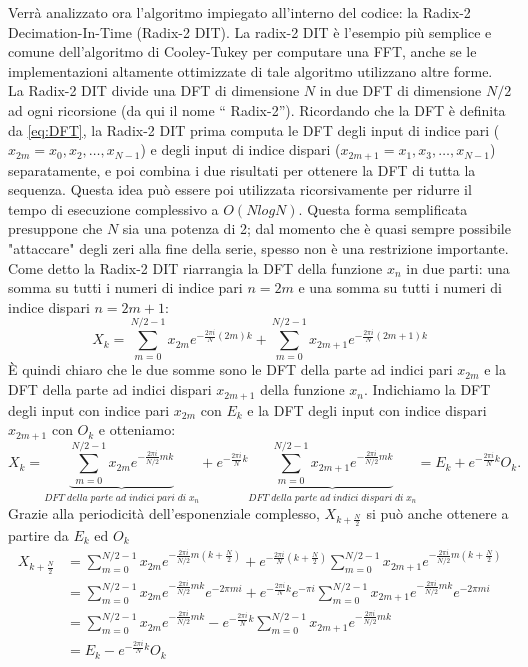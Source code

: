 \documentclass[a4paper, 12pt]{book}
\begin{document}
Verrà analizzato ora l'algoritmo impiegato all'interno del codice: la Radix-2 Decimation-In-Time (Radix-2 DIT).
La radix-2 DIT è l’esempio più semplice e comune dell'algoritmo di Cooley-Tukey per computare una FFT, anche se le implementazioni altamente ottimizzate di tale algoritmo utilizzano altre forme.
La Radix-2 DIT divide una DFT di dimensione $N$ in due DFT di dimensione $N/2$ ad ogni ricorsione (da qui il nome “ Radix-2”).
Ricordando che la DFT è definita da \ref{eq:DFT}, la Radix-2 DIT prima computa le DFT degli input di indice pari ($x_{2m}=x_0 , x_2 ,\ldots , x_{N-1}$) e degli input di indice dispari ($x_{2m+1}= x_1 , x_3 ,\ldots , x_{N-1}$) separatamente, e poi combina i due risultati per ottenere la DFT di tutta la sequenza.
Questa idea può essere poi utilizzata ricorsivamente per ridurre il tempo di esecuzione complessivo a $O(N log N)$.
Questa forma semplificata presuppone che $N$ sia una potenza di 2; dal momento che è quasi sempre possibile "attaccare" degli zeri alla fine della serie, spesso non è una restrizione importante.
Come detto la Radix-2 DIT riarrangia la DFT della funzione $x_n$ in due parti: una somma su tutti i numeri di indice pari $n=2m$ e una somma su tutti i numeri di indice dispari $n=2m+1$:
\begin{equation}
	X_k=\sum_{m=0}^{N/2-1} x_{2m} e^{-\frac{2\pi i}{N} (2m)k} + \sum_{m=0}^{N/2-1} 				x_{2m+1} e^{-\frac{2 \pi i}{N} (2m+1)k}
\end{equation}
È quindi chiaro che le due somme sono le DFT della parte ad indici pari $x_{2m}$ e la DFT della parte ad indici dispari $x_{2m+1}$ della funzione $x_n$.
Indichiamo la DFT degli input con indice pari $x_{2m}$ con $E_k$ e la DFT degli input con indice dispari $x_{2m+1}$ con $O_k$ e otteniamo:
\begin{equation}
	X_k=\underbrace{\sum_{m=0}^{N/2-1} x_{2m} e^{-\frac{2 \pi i}{N/2}mk}}_{DFT\; della			\; parte\; ad\; indici\; pari\; di\; x_n} + e^{-\frac{2 \pi i}{N}k} 						\underbrace{\sum_{m=0}^{N/2-1} x_{2m+1}e^{-\frac{2 \pi i}{N/2}mk}}_{DFT\; della\; 			parte\; ad\; indici\; dispari\; di\; x_n} = E_k + e^{-\frac{2 \pi i}{N}k} O_k .
\end{equation}
Grazie alla periodicità dell’esponenziale complesso, $X_{k+\frac{N}{2}}$ si può anche ottenere a partire da $E_k$ ed $O_k$
\begin{align}
	X_{k+\frac{N}{2}} &= \sum_{m=0}^{N/2-1} x_{2m} e^{-\frac{2 \pi i}{N/2}m(k+\frac{N}			{2})} + e^{-\frac{2 \pi i}{N}(k+\frac{N}{2})} \sum_{m=0}^{N/2-1}  x_{2m+1} e^{-				\frac{2 \pi i}{N/2}m(k+\frac{N}{2})} \\
	&=\sum_{m=0}^{N/2-1} x_{2m} e^{-\frac{2 \pi i}{N/2}mk} e^{-2 \pi mi} + e^{-\frac{2 			\pi i}{N}k} e^{-\pi i} \sum_{m=0}^{N/2-1} x_{2m+1} e^{-\frac{2\pi i}{N/2} mk} e^{-2 	\pi mi} \\
	&=\sum_{m=0}^{N/2-1} x_{2m} e^{-\frac{2 \pi i}{N/2}mk} - e^{-\frac{2 \pi i}{N}k} 			\sum_{m=0}^{N/2-1} x_{2m+1} e^{-\frac{2\pi i}{N/2} mk} \\
	&=E_k - e^{-\frac{2 \pi i}{N}k} O_k
\end{align}
\end{document}
